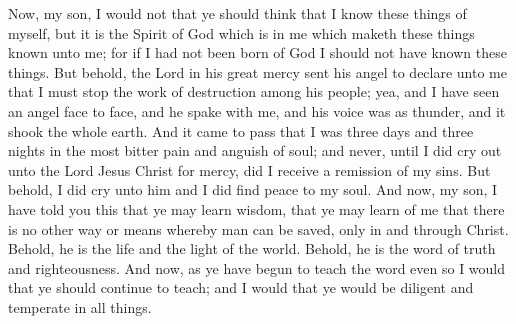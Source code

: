 \bverse \iffalse Now, my son, I would not that ye should think that I know these things of myself, but it is the Spirit of God which is in me which maketh these things known unto me; for if I had not been born of God I should not have known these things. \fi
Now, my son, I would not that ye should think that I know these things of myself, but it is the Spirit of God which is in me which maketh these things known unto me; for if I had not been born of God I should not have known these things.
\bverse \iffalse But behold, the Lord in his great mercy sent his angel to declare unto me that I must stop the work of destruction among his people; yea, and I have seen an angel face to face, and he spake with me, and his voice was as thunder, and it shook the whole earth. \fi
But behold, the Lord in his great mercy sent his angel to declare unto me that I must stop the work of destruction among his people; yea, and I have seen an angel face to face, and he spake with me, and his voice was as thunder, and it shook the whole earth.
\bverse \iffalse And it came to pass that I was three days and three nights in the most bitter pain and anguish of soul; and never, until I did cry out unto the Lord Jesus Christ for mercy, did I receive a remission of my sins. But behold, I did cry unto him and I did find peace to my soul. \fi
And it came to pass that I was three days and three nights in the most bitter pain and anguish of soul; and never, until I did cry out unto the Lord Jesus Christ for mercy, did I receive a remission of my sins. But behold, I did cry unto him and I did find peace to my soul.
\bverse \iffalse And now, my son, I have told you this that ye may learn wisdom, that ye may learn of me that there is no other way or means whereby man can be saved, only in and through Christ.  Behold, he is the life and the light of the world. Behold, he is the word of truth and righteousness. \fi
And now, my son, I have told you this that ye may learn wisdom, that ye may learn of me that there is no other way or means whereby man can be saved, only in and through Christ.  Behold, he is the life and the light of the world. Behold, he is the word of truth and righteousness.
\bverse \iffalse And now, as ye have begun to teach the word even so I would that ye should continue to teach; and I would that ye would be diligent and temperate in all things. \fi
And now, as ye have begun to teach the word even so I would that ye should continue to teach; and I would that ye would be diligent and temperate in all things.
